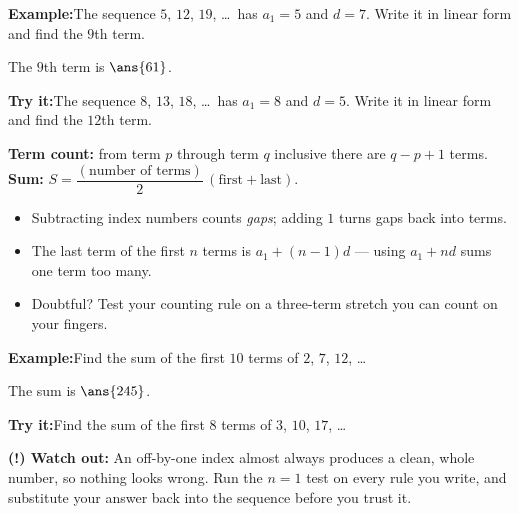 \documentclass[12pt]{article}
\begin{document}
\begin{examplebox}
\textbf{Example:}\quad The sequence $5$, $12$, $19$, \ldots\ has $a_1 = 5$ and
$d = 7$. Write it in linear form and find the $9$th term.

The $9$th term is $\ans{61}$.
\end{examplebox}

\begin{tryitbox}
\textbf{Try it:}\quad The sequence $8$, $13$, $18$, \ldots\ has $a_1 = 8$ and
$d = 5$. Write it in linear form and find the $12$th term.\\[2pt]
\end{tryitbox}


\begin{formulabox}
\textbf{Term count:} from term $p$ through term $q$ inclusive there are
$q - p + 1$ terms. \qquad
\textbf{Sum:} $S = \dfrac{(\text{number of terms})}{2}\,(\text{first} + \text{last})$.
\begin{itemize}[leftmargin=0.8cm, itemsep=1pt, topsep=2pt]
  \item Subtracting index numbers counts \emph{gaps}; adding $1$ turns gaps back
        into terms.
  \item The last term of the first $n$ terms is $a_1 + (n-1)d$ --- using
        $a_1 + nd$ sums one term too many.
  \item Doubtful? Test your counting rule on a three-term stretch you can count
        on your fingers.
\end{itemize}
\end{formulabox}

\begin{examplebox}
\textbf{Example:}\quad Find the sum of the first $10$ terms of $2$, $7$, $12$,
\ldots
{}

The sum is $\ans{245}$.
\end{examplebox}

\begin{tryitbox}
\textbf{Try it:}\quad Find the sum of the first $8$ terms of $3$, $10$, $17$,
\ldots\\[2pt]
\end{tryitbox}

\begin{watchoutbox}
\textbf{(!) Watch out:} An off-by-one index almost always produces a clean, whole
number, so nothing looks wrong. Run the $n=1$ test on every rule you write, and
substitute your answer back into the sequence before you trust it.
\end{watchoutbox}
\end{document}
